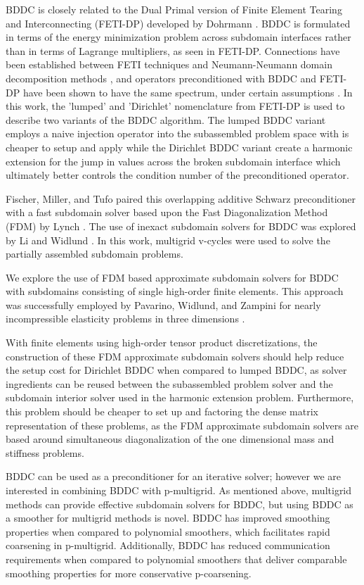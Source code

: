 BDDC is closely related to the Dual Primal version of Finite Element Tearing and Interconnecting (FETI-DP) developed by Dohrmann \cite{farhat1991method}.
BDDC is formulated in terms of the energy minimization problem across subdomain interfaces rather than in terms of Lagrange multipliers, as seen in FETI-DP.
Connections have been established between FETI techniques and Neumann-Neumann domain decomposition methods \cite{klawonn2001feti}, and operators preconditioned with BDDC and FETI-DP have been shown to have the same spectrum, under certain assumptions \cite{mandel2007bddc}.
In this work, the 'lumped' and 'Dirichlet' nomenclature from FETI-DP is used to describe two variants of the BDDC algorithm.
The lumped BDDC variant employs a naive injection operator into the subassembled problem space with is cheaper to setup and apply while the Dirichlet BDDC variant create a harmonic extension for the jump in values across the broken subdomain interface which ultimately better controls the condition number of the preconditioned operator.

Fischer, Miller, and Tufo \cite{fischer2000overlapping} paired this overlapping additive Schwarz preconditioner with a fast subdomain solver based upon the Fast Diagonalization Method (FDM) by Lynch \cite{lynch1964direct}.
The use of inexact subdomain solvers for BDDC was explored by Li and Widlund \cite{li2007use}.
In this work, multigrid v-cycles were used to solve the partially assembled subdomain problems.

We explore the use of FDM based approximate subdomain solvers for BDDC with subdomains consisting of single high-order finite elements.
This approach was successfully employed by Pavarino, Widlund, and Zampini for nearly incompressible elasticity problems in three dimensions \cite{pavarino2010bddc}.

With finite elements using high-order tensor product discretizations, the construction of these FDM approximate subdomain solvers should help reduce the setup cost for Dirichlet BDDC when compared to lumped BDDC, as solver ingredients can be reused between the subassembled problem solver and the subdomain interior solver used in the harmonic extension problem.
Furthermore, this problem should be cheaper to set up and factoring the dense matrix representation of these problems, as the FDM approximate subdomain solvers are based around simultaneous diagonalization of the one dimensional mass and stiffness problems.

BDDC can be used as a preconditioner for an iterative solver; however we are interested in combining BDDC with p-multigrid.
As mentioned above, multigrid methods can provide effective subdomain solvers for BDDC, but using BDDC as a smoother for multigrid methods is novel.
BDDC has improved smoothing properties when compared to polynomial smoothers, which facilitates rapid coarsening in p-multigrid.
Additionally, BDDC has reduced communication requirements when compared to polynomial smoothers that deliver comparable smoothing properties for more conservative p-coarsening.

